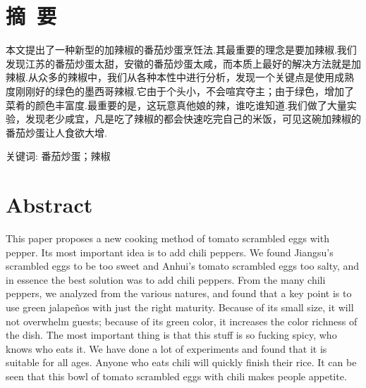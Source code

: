 %
%
% 
%




\title{\hei{}\mytitle}
\maketitle
\thispagestyle{empty}
\newpage


\tableofcontents
\newpage


\setcounter{page}{1}
\section*{摘~要}
本文提出了一种新型的加辣椒的番茄炒蛋烹饪法.其最重要的理念是要加辣椒.我们发现江苏的番茄炒蛋太甜，安徽的番茄炒蛋太咸，而本质上最好的解决方法就是加辣椒.从众多的辣椒中，我们从各种本性中进行分析，发现一个关键点是使用成熟度刚刚好的绿色的墨西哥辣椒.它由于个头小，不会喧宾夺主；由于绿色，增加了菜肴的颜色丰富度.最重要的是，这玩意真他娘的辣，谁吃谁知道.我们做了大量实验，发现老少咸宜，凡是吃了辣椒的都会快速吃完自己的米饭，可见这碗加辣椒的番茄炒蛋让人食欲大增.

\vspace{1em}\noindent
{}\hei 关键词:
\song 番茄炒蛋；辣椒
\newpage



\section*{Abstract}
This paper proposes a new cooking method of tomato scrambled eggs with pepper. Its most important idea is to add chili peppers. We found Jiangsu's scrambled eggs to be too sweet and Anhui's tomato scrambled eggs too salty, and in essence the best solution was to add chili peppers. From the many chili peppers, we analyzed from the various natures, and found that a key point is to use green jalapeños with just the right maturity. Because of its small size, it will not overwhelm guests; because of its green color, it increases the color richness of the dish. The most important thing is that this stuff is so fucking spicy, who knows who eats it. We have done a lot of experiments and found that it is suitable for all ages. Anyone who eats chili will quickly finish their rice. It can be seen that this bowl of tomato scrambled eggs with chili makes people appetite.

